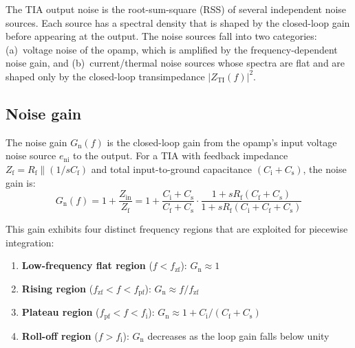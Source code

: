 \documentclass[a4paper,11pt]{article}
\begin{document}
The TIA output noise is the root-sum-square (RSS) of several
independent noise sources.  Each source has a spectral density that is
shaped by the closed-loop gain before appearing at the output.  The
noise sources fall into two categories: (a)~voltage noise of the opamp,
which is amplified by the frequency-dependent noise gain, and
(b)~current/thermal noise sources whose spectra are flat and are shaped
only by the closed-loop transimpedance $|Z_{\mathrm{TI}}(f)|^2$.

\subsection{Noise gain}

The noise gain $G_{\mathrm{n}}(f)$ is the closed-loop gain from the
opamp's input voltage noise source $e_{\mathrm{ni}}$ to the output.
For a TIA with feedback impedance
$Z_{\mathrm{f}} = R_{\mathrm{f}} \| (1/sC_{\mathrm{f}})$ and total
input-to-ground capacitance $(C_{\mathrm{i}} + C_{\mathrm{s}})$, the
noise gain is:
\begin{equation*}
  G_{\mathrm{n}}(f)
  = 1 + \frac{Z_{\mathrm{in}}}{Z_{\mathrm{f}}}
  = 1 + \frac{C_{\mathrm{i}} + C_{\mathrm{s}}}
             {C_{\mathrm{f}} + C_{\mathrm{s}}}
    \cdot
    \frac{1 + s R_{\mathrm{f}} (C_{\mathrm{f}} + C_{\mathrm{s}})}
         {1 + s R_{\mathrm{f}} (C_{\mathrm{i}} + C_{\mathrm{f}}
          + C_{\mathrm{s}})}
\end{equation*}

This gain exhibits four distinct frequency regions that are exploited
for piecewise integration:

\begin{enumerate}
  \item \textbf{Low-frequency flat region}
    ($f < f_{\mathrm{zf}}$):
    $G_{\mathrm{n}} \approx 1$
  \item \textbf{Rising region}
    ($f_{\mathrm{zf}} < f < f_{\mathrm{pf}}$):
    $G_{\mathrm{n}} \approx f / f_{\mathrm{zf}}$
  \item \textbf{Plateau region}
    ($f_{\mathrm{pf}} < f < f_{\mathrm{i}}$):
    $G_{\mathrm{n}} \approx 1 + C_{\mathrm{i}} / (C_{\mathrm{f}}
    + C_{\mathrm{s}})$
  \item \textbf{Roll-off region}
    ($f > f_{\mathrm{i}}$):
    $G_{\mathrm{n}}$ decreases as the loop gain falls below unity
\end{enumerate}
\end{document}
